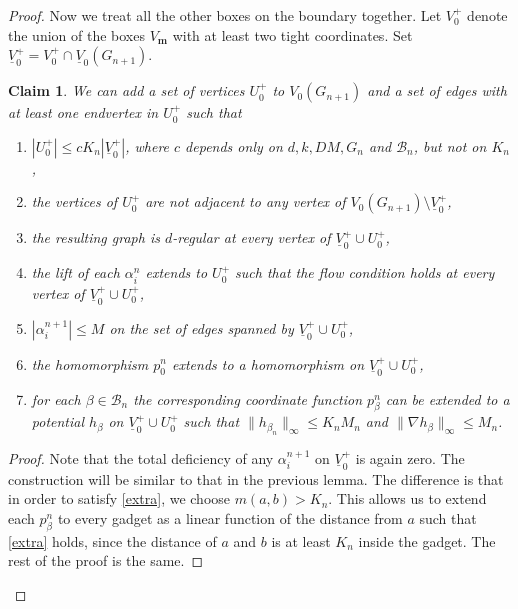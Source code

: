 \documentclass[10pt]{article}
\theoremstyle{plain}
\newtheorem{claim}[lemma]{Claim}
\theoremstyle{remark}
\newcommand{\1}{\mathbbm{1}}
\numberwithin{equation}{section}
\begin{document}
\begin{proof}
Now we treat all the other boxes on the boundary together. Let $V_0^+$ denote the union of the boxes $V_{\mathbf{m}}$ with at least two tight coordinates. Set $\underline{V}_0^+=V_0^+ \cap \underline{V}_0(G_{n+1})$.

\begin{claim}\label{lemma:surgery2}
We can add a set of vertices $U_0^+$ to $V_0(G_{n+1})$ and a set of edges with at least one endvertex in $U_0^+$ such that 

\begin{enumerate}

\item 
$|U_0^+| \leq c K_n |\underline{V}_0^+|$, where $c$ depends only on $d, k, DM, G_n$ and $\mathcal{B}_n$, but not on $K_n$,

\item 
the vertices of $U_0^+$ are not adjacent to any vertex of 
$V_0(G_{n+1}) \setminus \underline{V}_0^+$,

\item 
the resulting graph is $d$-regular at every vertex of $\underline{V}_0^+ \cup U_0^+$,

\item
the lift of each $\alpha^n_i$ extends to $U_0^+$ such that the flow condition holds at every vertex of  $\underline{V}_0^+ \cup U_0^+$,

\item
$|\alpha^{n+1}_i| \leq M$ on the set of edges spanned by $\underline{V}_0^+ \cup U_0^+$,

\item
the homomorphism $p_0^n$ extends to a homomorphism on  $\underline{V}_0^+ \cup U_0^+$,


\item \label{extra} for each $\beta \in \mathcal{B}_n$ the corresponding coordinate function $p^n_{\beta}$ can be extended to a potential $h_{\beta}$ on $\underline{V}_0^+ \cup U_0^+$ such that $\|h_{\beta_{n}}\|_{\infty}\leq K_n M_n$ and $\| \nabla h_{\beta} \|_{\infty} \leq M_n$.
\end{enumerate} 
\end{claim}

\begin{proof}
Note that the total deficiency of any $\alpha_i^{n+1}$ on $\underline{V}_0^+$ is again zero. The construction will be similar to that in the previous lemma.  The difference is that in order to satisfy \ref{extra}, we choose $m(a,b)>K_n$. 
This allows us to extend each $p^n_{\beta}$ to every gadget as a linear function of the distance from $a$ such that \ref{extra} holds, since the distance of $a$ and $b$ is at least $K_n$ inside the gadget.
The rest of the proof is the same. 
\end{proof}


\end{proof}
\end{document}
